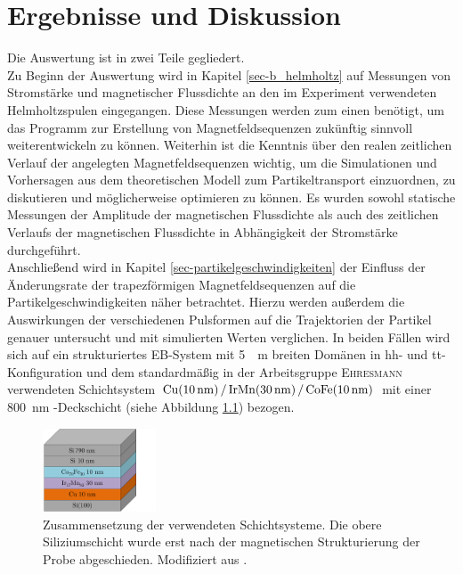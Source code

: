 \documentclass[page,pdftex,12pt,a4paper,twoside,openright]{scrbook}
\begin{document}
\chapter{Ergebnisse und Diskussion \label{sec-ergebnisse}}
\label{sec:org17c2d22}
Die Auswertung ist in zwei Teile gegliedert.\\
Zu Beginn der Auswertung wird in Kapitel \ref{sec-b_helmholtz} auf Messungen von Stromstärke und magnetischer Flussdichte an den im Experiment verwendeten Helmholtzspulen eingegangen. Diese Messungen werden zum einen benötigt, um das Programm zur Erstellung von Magnetfeldsequenzen zukünftig sinnvoll weiterentwickeln zu können. Weiterhin ist die Kenntnis über den realen zeitlichen Verlauf der angelegten Magnetfeldsequenzen wichtig, um die Simulationen und Vorhersagen aus dem theoretischen Modell zum Partikeltransport einzuordnen, zu diskutieren und möglicherweise optimieren zu können. Es wurden sowohl statische Messungen der Amplitude der magnetischen Flussdichte als auch des zeitlichen Verlaufs der magnetischen Flussdichte in Abhängigkeit der Stromstärke durchgeführt.\\

Anschließend wird in Kapitel \ref{sec-partikelgeschwindigkeiten} der Einfluss der Änderungsrate der trapezförmigen Magnetfeldsequenzen auf die Partikelgeschwindigkeiten näher betrachtet. Hierzu werden außerdem die Auswirkungen der verschiedenen Pulsformen auf die Trajektorien der Partikel genauer untersucht und mit simulierten Werten verglichen. In beiden Fällen wird sich auf ein strukturiertes EB-System mit \SI{5}{\mu\meter} breiten Domänen in hh- und tt-Konfiguration und dem standardmäßig in der Arbeitsgruppe \textsc{Ehresmann} verwendeten Schichtsystem \(\ce{ Cu(\SI{10}{\nano\meter}) / IrMn(\SI{30}{\nano\meter}) / CoFe(\SI{10}{\nano\meter}) }\) mit einer \SI{800}{\nano\meter} -Deckschicht (siehe Abbildung \ref{fig-layer}) bezogen.\\

\begin{figure}[h]
\centering
\includegraphics[width=0.3\textwidth]{img/layer.png}
\caption{\label{fig-layer}
Zusammensetzung der verwendeten Schichtsysteme. Die obere Siliziumschicht wurde erst nach der magnetischen Strukturierung der Probe abgeschieden. Modifiziert aus \cite{janzen_fernsteuerbarer_2018}.}
\end{figure}
\end{document}
